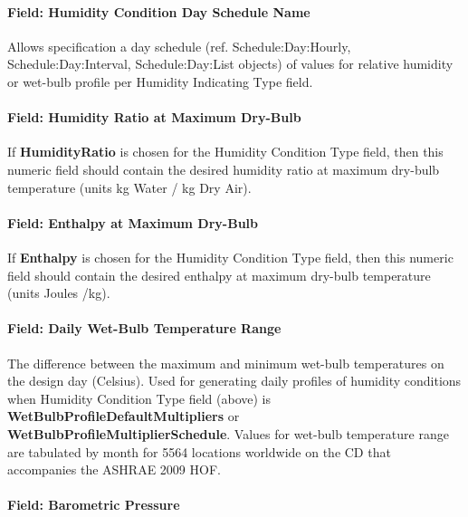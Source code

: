\paragraph{Field: Humidity Condition Day Schedule Name}\label{field-humidity-condition-day-schedule-name}

Allows specification a day schedule (ref. Schedule:Day:Hourly, Schedule:Day:Interval, Schedule:Day:List objects) of values for relative humidity or wet-bulb profile per Humidity Indicating Type field.

\paragraph{Field: Humidity Ratio at Maximum Dry-Bulb}\label{field-humidity-ratio-at-maximum-dry-bulb}

If \textbf{HumidityRatio} is chosen for the Humidity Condition Type field, then this numeric field should contain the desired humidity ratio at maximum dry-bulb temperature (units kg Water / kg Dry Air).

\paragraph{Field: Enthalpy at Maximum Dry-Bulb}\label{field-enthalpy-at-maximum-dry-bulb}

If \textbf{Enthalpy} is chosen for the Humidity Condition Type field, then this numeric field should contain the desired enthalpy at maximum dry-bulb temperature (units Joules /kg).

\paragraph{Field: Daily Wet-Bulb Temperature Range}\label{field-daily-wet-bulb-temperature-range}

The difference between the maximum and minimum wet-bulb temperatures on the design day (Celsius). Used for generating daily profiles of humidity conditions when Humidity Condition Type field (above) is \textbf{WetBulbProfileDefaultMultipliers} or \textbf{WetBulbProfileMultiplierSchedule}. Values for wet-bulb temperature range are tabulated by month for 5564 locations worldwide on the CD that accompanies the ASHRAE 2009 HOF.

\paragraph{Field: Barometric Pressure}\label{field-barometric-pressure}

